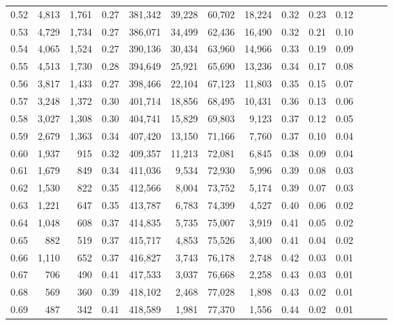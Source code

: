 \begin{tabular}{rrrrrrrrrrrrrr}
0.52 &   4,813 &  1,761 &  0.27 &  381,342 &   39,228 &  60,702 &  18,224 &  0.32 &  0.23 &      0.12 \\
0.53 &   4,729 &  1,734 &  0.27 &  386,071 &   34,499 &  62,436 &  16,490 &  0.32 &  0.21 &      0.10 \\
0.54 &   4,065 &  1,524 &  0.27 &  390,136 &   30,434 &  63,960 &  14,966 &  0.33 &  0.19 &      0.09 \\
0.55 &   4,513 &  1,730 &  0.28 &  394,649 &   25,921 &  65,690 &  13,236 &  0.34 &  0.17 &      0.08 \\
0.56 &   3,817 &  1,433 &  0.27 &  398,466 &   22,104 &  67,123 &  11,803 &  0.35 &  0.15 &      0.07 \\
0.57 &   3,248 &  1,372 &  0.30 &  401,714 &   18,856 &  68,495 &  10,431 &  0.36 &  0.13 &      0.06 \\
0.58 &   3,027 &  1,308 &  0.30 &  404,741 &   15,829 &  69,803 &   9,123 &  0.37 &  0.12 &      0.05 \\
0.59 &   2,679 &  1,363 &  0.34 &  407,420 &   13,150 &  71,166 &   7,760 &  0.37 &  0.10 &      0.04 \\
0.60 &   1,937 &    915 &  0.32 &  409,357 &   11,213 &  72,081 &   6,845 &  0.38 &  0.09 &      0.04 \\
0.61 &   1,679 &    849 &  0.34 &  411,036 &    9,534 &  72,930 &   5,996 &  0.39 &  0.08 &      0.03 \\
0.62 &   1,530 &    822 &  0.35 &  412,566 &    8,004 &  73,752 &   5,174 &  0.39 &  0.07 &      0.03 \\
0.63 &   1,221 &    647 &  0.35 &  413,787 &    6,783 &  74,399 &   4,527 &  0.40 &  0.06 &      0.02 \\
0.64 &   1,048 &    608 &  0.37 &  414,835 &    5,735 &  75,007 &   3,919 &  0.41 &  0.05 &      0.02 \\
0.65 &     882 &    519 &  0.37 &  415,717 &    4,853 &  75,526 &   3,400 &  0.41 &  0.04 &      0.02 \\
0.66 &   1,110 &    652 &  0.37 &  416,827 &    3,743 &  76,178 &   2,748 &  0.42 &  0.03 &      0.01 \\
0.67 &     706 &    490 &  0.41 &  417,533 &    3,037 &  76,668 &   2,258 &  0.43 &  0.03 &      0.01 \\
0.68 &     569 &    360 &  0.39 &  418,102 &    2,468 &  77,028 &   1,898 &  0.43 &  0.02 &      0.01 \\
0.69 &     487 &    342 &  0.41 &  418,589 &    1,981 &  77,370 &   1,556 &  0.44 &  0.02 &      0.01 \\

\end{tabular}
